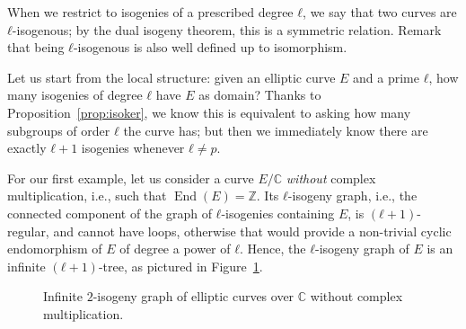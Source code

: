 \documentclass[10pt]{article}
\theoremstyle{plain}
\theoremstyle{definition}
\DeclareMathOperator{\End}{End} %
\begin{document}
When we restrict to isogenies of a prescribed degree $ℓ$, we say that
two curves are $ℓ$-isogenous; by the dual isogeny theorem, this is a
symmetric relation. %
Remark that being $ℓ$-isogenous is also well defined up to
isomorphism.

Let us start from the local structure: given an elliptic curve $E$ and
a prime $ℓ$, how many isogenies of degree $ℓ$ have $E$ as domain? %
Thanks to Proposition~\ref{prop:isoker}, we know this is equivalent to
asking how many subgroups of order $ℓ$ the curve has; but then we
immediately know there are exactly $ℓ+1$ isogenies whenever $ℓ≠p$.

For our first example, let us consider a curve $E/ℂ$ \emph{without}
complex multiplication, i.e., such that $\End(E)=ℤ$.  %
Its $ℓ$-isogeny graph, i.e., the connected component of the graph of
$ℓ$-isogenies containing $E$, is $(ℓ+1)$-regular, and cannot have
loops, otherwise that would provide a non-trivial cyclic endomorphism of $E$
of degree a power of $ℓ$. %
Hence, the $ℓ$-isogeny graph of $E$ is an infinite $(ℓ+1)$-tree, as
pictured in Figure~\ref{fig:infinite-tree}. %

\begin{figure}
  \centering
  
    \caption{Infinite $2$-isogeny graph of elliptic curves over $ℂ$
      without complex multiplication.}
  \label{fig:infinite-tree}
\end{figure}
\end{document}
